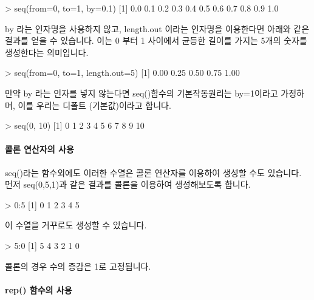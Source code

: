 \begin{Schunk}
\begin{Soutput}
> seq(from=0, to=1, by=0.1)
 [1] 0.0 0.1 0.2 0.3 0.4 0.5 0.6 0.7 0.8 0.9 1.0
\end{Soutput}
\end{Schunk}

by 라는 인자명을 사용하지 않고, length.out 이라는 인자명을 이용한다면 아래와 같은 결과를 얻을 수 있습니다. 
이는 0 부터 1 사이에서 균등한 길이를 가지는 5개의 숫자를 생성한다는 의미입니다. 

\begin{Schunk}
\begin{Soutput}
> seq(from=0, to=1, length.out=5)
[1] 0.00 0.25 0.50 0.75 1.00
\end{Soutput}
\end{Schunk}


만약 by 라는 인자를 넣지 않는다면 seq()함수의 기본작동원리는 by=1이라고 가정하며, 이를 우리는 디폴트 (기본값)이라고 합니다. 

\begin{Schunk}
\begin{Soutput}
> seq(0, 10)
 [1]  0  1  2  3  4  5  6  7  8  9 10	
\end{Soutput}
\end{Schunk}

\paragraph{콜론 연산자의 사용} 

seq()라는 함수외에도 이러한 수열은 콜론 연산자를 이용하여 생성할 수도 있습니다. 
먼저 seq(0,5,1)과 같은 결과를 콜론을 이용하여  생성해보도록 합니다. 

\begin{Schunk}
\begin{Soutput}
> 0:5
[1] 0 1 2 3 4 5
\end{Soutput}
\end{Schunk}

이 수열을 거꾸로도 생성할 수 있습니다. 

\begin{Schunk}
\begin{Soutput}
> 5:0
[1] 5 4 3 2 1 0	
\end{Soutput}
\end{Schunk}

콜론의 경우 수의 증감은 1로 고정됩니다.

\paragraph{rep() 함수의 사용} 

